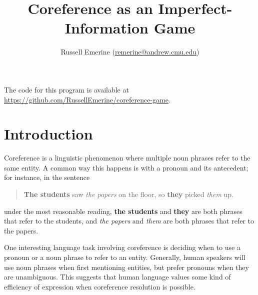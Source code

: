 \documentclass[11pt]{article}
\begin{document}
    \setlength{\parindent}{0pt}
    \setlength{\parskip}{5pt}
    \pagestyle{fancy}
    \setlength{\headheight}{13.59999pt}
    \addtolength{\topmargin}{-1.59999pt}
    \fancyhf{}

    \newenvironment{nb}
    {\begin{center}
         \begin{tabular}{|p{0.9\textwidth}}
             \textit{N.B.}
             }
             {
         \end{tabular}
    \end{center}
    }


    \newcommand{\Generator}{\textsc{generator}}
    \newcommand{\Resolver}{\textsc{resolver}}
    \newcommand{\Placeholder}{\textsc{placeholder}}
    \newcommand{\EntityGuessingGame}{\textsc{entity guessing game}}

    \title{Coreference as an Imperfect-Information Game}
    \author{Russell Emerine (\url{remerine@andrew.cmu.edu})}
    \maketitle

    The code for this program is available at \url{https://github.com/RussellEmerine/coreference-game}.


    \section{Introduction}\label{sec:introduction}

    Coreference is a linguistic phenomenon where
    multiple noun phrases refer to the same entity.
    A common way this happens is with a pronoun and its antecedent;
    for instance, in the sentence
    \begin{quote}
        \textbf{The students} saw \textit{the papers} on the floor, so \textbf{they} picked \textit{them} up.
    \end{quote}
    under the most reasonable reading,
    \textbf{the students} and \textbf{they} are both phrases that refer to the students,
    and \textit{the papers} and \textit{them} are both phrases that refer to the papers.

    One interesting language task involving coreference
    is deciding when to use a pronoun or a noun phrase to refer to an entity.
    Generally, human speakers will use noun phrases when first mentioning entities,
    but prefer pronouns when they are unambiguous.
    This suggests that human language values some kind of efficiency of expression
    when coreference resolution is possible.
\end{document}
